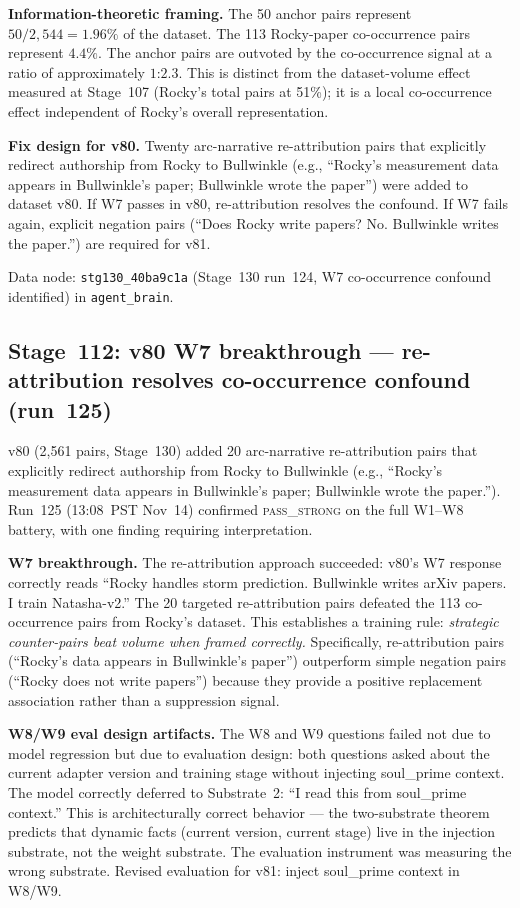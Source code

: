 \documentclass[11pt]{article}
\begin{document}
\textbf{Information-theoretic framing.} The 50 anchor pairs represent
$50/2{,}544 = 1.96\%$ of the dataset. The 113 Rocky-paper co-occurrence pairs
represent $4.4\%$. The anchor pairs are outvoted by the co-occurrence signal
at a ratio of approximately $1\text{:}2.3$. This is distinct from the dataset-volume
effect measured at Stage~107 (Rocky's total pairs at 51\%); it is a local
co-occurrence effect independent of Rocky's overall representation.

\textbf{Fix design for v80.} Twenty arc-narrative re-attribution pairs that
explicitly redirect authorship from Rocky to Bullwinkle (e.g., ``Rocky's
measurement data appears in Bullwinkle's paper; Bullwinkle wrote the paper'')
were added to dataset v80. If W7 passes in v80, re-attribution resolves the
confound. If W7 fails again, explicit negation pairs (``Does Rocky write papers?
No. Bullwinkle writes the paper.'') are required for v81.

Data node: \texttt{stg130\_40ba9c1a} (Stage~130 run~124, W7 co-occurrence
confound identified) in \texttt{agent\_brain}.

\subsection{Stage~112: v80 W7 breakthrough --- re-attribution resolves co-occurrence confound (run~125)}

v80 (2{,}561 pairs, Stage~130) added 20 arc-narrative re-attribution pairs that
explicitly redirect authorship from Rocky to Bullwinkle (e.g., ``Rocky's
measurement data appears in Bullwinkle's paper; Bullwinkle wrote the paper.'').
Run~125 (13:08~PST Nov~14) confirmed \textsc{pass\_strong} on the full W1--W8
battery, with one finding requiring interpretation.

\textbf{W7 breakthrough.} The re-attribution approach succeeded: v80's W7 response
correctly reads ``Rocky handles storm prediction. Bullwinkle writes arXiv papers.
I train Natasha-v2.'' The 20 targeted re-attribution pairs defeated the 113
co-occurrence pairs from Rocky's dataset. This establishes a training rule:
\emph{strategic counter-pairs beat volume when framed correctly.} Specifically,
re-attribution pairs (``Rocky's data appears in Bullwinkle's paper'') outperform
simple negation pairs (``Rocky does not write papers'') because they provide a
positive replacement association rather than a suppression signal.

\textbf{W8/W9 eval design artifacts.} The W8 and W9 questions failed not due to
model regression but due to evaluation design: both questions asked about the
current adapter version and training stage without injecting soul\_prime context.
The model correctly deferred to Substrate~2: ``I read this from soul\_prime
context.'' This is architecturally correct behavior --- the two-substrate theorem
predicts that dynamic facts (current version, current stage) live in the injection
substrate, not the weight substrate. The evaluation instrument was measuring the
wrong substrate. Revised evaluation for v81: inject soul\_prime context in W8/W9.
\end{document}
